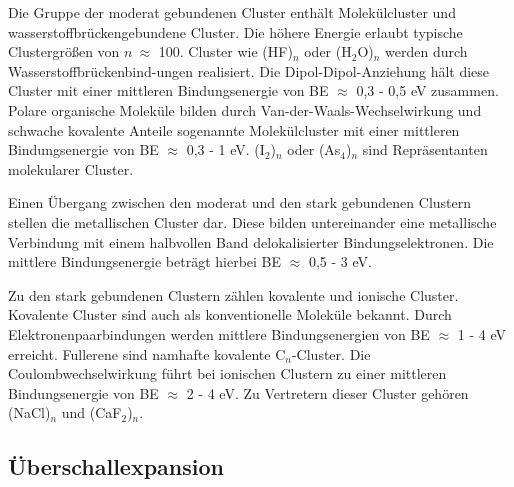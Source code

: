  Die Gruppe der moderat gebundenen Cluster enthält Molekülcluster und wasserstoffbrückengebundene Cluster. Die höhere Energie erlaubt typische Clustergrößen von $n \ \approx$ 100.
 Cluster wie (HF)$_n$ oder (H$_2$O)$_n$ werden durch Wasserstoffbrückenbind-ungen realisiert. Die Dipol-Dipol-Anziehung hält diese Cluster mit einer mittleren Bindungsenergie von BE $\approx$ 0,3 - 0,5 eV zusammen. \cite{jortner1984cluster}
 Polare organische Moleküle bilden durch Van-der-Waals-Wechselwirkung und schwache kovalente Anteile sogenannte Molekülcluster mit einer mittleren Bindungsenergie von BE $\approx$ 0,3 - 1 eV. (I$_2$)$_n$ oder (As$_4$)$_n$ sind Repräsentanten molekularer Cluster. \cite{jortner1984cluster}
 
 Einen Übergang zwischen den moderat und den stark gebundenen Clustern stellen die metallischen Cluster dar. Diese bilden untereinander eine metallische Verbindung mit einem halbvollen Band delokalisierter Bindungselektronen. Die mittlere Bindungsenergie beträgt hierbei BE $\approx$ 0,5 - 3 eV. \cite{jortner1984cluster}
 
 Zu den stark gebundenen Clustern zählen kovalente und ionische Cluster.
 Kovalente Cluster sind auch als konventionelle Moleküle bekannt. Durch Elektronenpaarbindungen  werden mittlere Bindungsenergien von BE $\approx$ 1 - 4 eV erreicht. Fullerene sind namhafte kovalente C$_n$-Cluster.  \cite{jortner1984cluster}
 Die Coulombwechselwirkung führt bei ionischen Clustern zu einer mittleren Bindungsenergie von BE $\approx$ 2 - 4 eV. Zu Vertretern dieser Cluster gehören (NaCl)$_n$ und (CaF$_2$)$_n$. \cite{jortner1984cluster} \\

\subsection{Überschallexpansion} \label{sec:uberschallexp}

